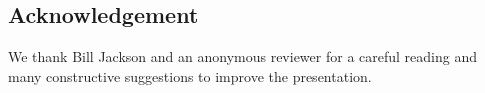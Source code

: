 \documentclass[10pt]{article}
\begin{document}
\subsection*{Acknowledgement}
We thank Bill Jackson and an anonymous reviewer for a careful reading and many constructive suggestions to improve the presentation.







\end{document}
